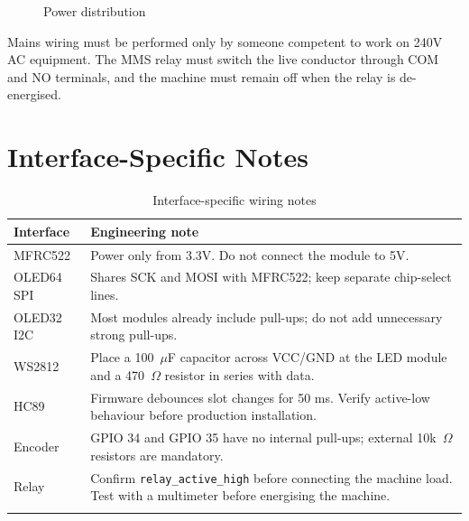 \begin{figure}[H]
\centering
{}
\caption{Power distribution}
\label{fig:power_distribution}
\end{figure}

\begin{warnbox}
Mains wiring must be performed only by someone competent to work on 240V AC equipment. The MMS relay must switch the live conductor through COM and NO terminals, and the machine must remain off when the relay is de-energised.
\end{warnbox}

\section{Interface-Specific Notes}

\begin{longtable}{L{3.5cm}L{11cm}}
\toprule
\textbf{Interface} & \textbf{Engineering note} \\
\midrule
\endhead
MFRC522 & Power only from 3.3V. Do not connect the module to 5V. \\
OLED64 SPI & Shares SCK and MOSI with MFRC522; keep separate chip-select lines. \\
OLED32 I2C & Most modules already include pull-ups; do not add unnecessary strong pull-ups. \\
WS2812 & Place a 100~$\mu$F capacitor across VCC/GND at the LED module and a 470~$\Omega$ resistor in series with data. \\
HC89 & Firmware debounces slot changes for 50 ms. Verify active-low behaviour before production installation. \\
Encoder & GPIO 34 and GPIO 35 have no internal pull-ups; external 10k~$\Omega$ resistors are mandatory. \\
Relay & Confirm \texttt{relay\_active\_high} before connecting the machine load. Test with a multimeter before energising the machine. \\
\bottomrule
\caption{Interface-specific wiring notes}
\label{tab:wiring_notes}
\end{longtable}
